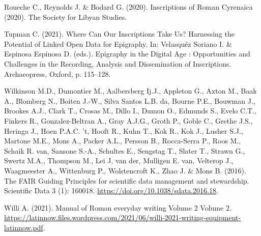 \documentclass[
  10pt,
]{article}
\newlength{\cslhangindent}
\newlength{\cslentryspacingunit} %
\newenvironment{CSLReferences}[2] %
 {%
  \setlength{\parindent}{0pt}
  \ifodd #1
  \let\oldpar\par
  \def\par{\hangindent=\cslhangindent\oldpar}
  \fi
  \setlength{\parskip}{#2\cslentryspacingunit}
 }%
 {}
\begin{document}
\begin{CSLReferences}{1}{0}
\leavevmode{}%
Roueche C., Reynolds J. \& Bodard G. (2020). Inscriptions of {Roman}
{Cyrenaica} (2020). The Society for Libyan Studies.

\leavevmode{}%
Tupman C. (2021). Where {Can} {Our} {Inscriptions} {Take} {Us}?
{Harnessing} the {Potential} of {Linked} {Open} {Data} for {Epigraphy}.
In: Velasquéz Soriano I. \& Espinosa Espinosa D. (eds.). Epigraphy in
the {Digital} {Age} : {Opportunities} and {Challenges} in the
{Recording}, {Analysis} and {Dissemination} of {Inscriptions}.
Archaeopress, Oxford, p. 115--128.

\leavevmode{}%
Wilkinson M.D., Dumontier M., Aalbersberg Ij.J., Appleton G., Axton M.,
Baak A., Blomberg N., Boiten J.-W., Silva Santos L.B. da, Bourne P.E.,
Bouwman J., Brookes A.J., Clark T., Crosas M., Dillo I., Dumon O.,
Edmunds S., Evelo C.T., Finkers R., Gonzalez-Beltran A., Gray A.J.G.,
Groth P., Goble C., Grethe J.S., Heringa J., Hoen P.A.C. 't, Hooft R.,
Kuhn T., Kok R., Kok J., Lusher S.J., Martone M.E., Mons A., Packer
A.L., Persson B., Rocca-Serra P., Roos M., Schaik R. van, Sansone S.-A.,
Schultes E., Sengstag T., Slater T., Strawn G., Swertz M.A., Thompson
M., Lei J. van der, Mulligen E. van, Velterop J., Waagmeester A.,
Wittenburg P., Wolstencroft K., Zhao J. \& Mons B. (2016). The {FAIR}
{Guiding} {Principles} for scientific data management and stewardship.
Scientific Data 3 (1): 160018.
\url{https://doi.org/10.1038/sdata.2016.18}.

\leavevmode{}%
Willi A. (2021). Manual of {Roman} everyday writing {Volume} 2 {Volume}
2.
\url{https://latinnow.files.wordpress.com/2021/06/willi-2021-writing-equipment-latinnow.pdf}.

\end{CSLReferences}
\end{document}
